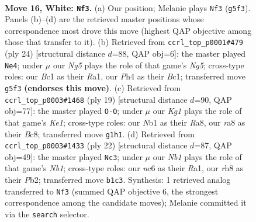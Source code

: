 \documentclass[11pt]{article}
\begin{document}
\clearpage

\begin{figure}[p]\centering
\begin{subfigure}{0.46\textwidth}\centering
\resizebox{\linewidth}{!}{%
\newchessgame
\chessboard[
  setfen={r1b1kb1r/2q2ppp/1pn5/p3P1N1/3p3P/1Q6/PP3PP1/RNB2RK1 w q - 2 16},
  showmover=false,
  pgfstyle=straightmove, color=movearrow, markmove={g5-f3}
]}
\caption{}
\end{subfigure}\hfill
\begin{subfigure}{0.46\textwidth}\centering
\resizebox{\linewidth}{!}{%
\newchessgame
\chessboard[
  setfen={r1b2rk1/ppq2pp1/2nbp2p/6N1/3P4/1BP5/P3QPPP/R1B1K2R w KQ - 0 13},
  showmover=false,
  pgfstyle=straightmove, color=movearrow, markmove={g5-e4}
]}
\caption{}
\end{subfigure}
\\[4pt]
\begin{subfigure}{0.46\textwidth}\centering
\resizebox{\linewidth}{!}{%
\newchessgame
\chessboard[
  setfen={r1b1k2r/ppp1qppp/2n5/3p4/3Pn3/PQ6/1PP1NPPP/R1B1KB1R b KQkq - 2 10},
  showmover=false,
  pgfstyle=straightmove, color=movearrow, markmove={e8-g8}
]}
\caption{}
\end{subfigure}\hfill
\begin{subfigure}{0.46\textwidth}\centering
\resizebox{\linewidth}{!}{%
\newchessgame
\chessboard[
  setfen={r1b1k2r/ppq1bppp/2p2n2/8/8/1Q2PB2/PP1B1PPP/RN3RK1 w kq - 4 12},
  showmover=false,
  pgfstyle=straightmove, color=movearrow, markmove={b1-c3}
]}
\caption{}
\end{subfigure}
\caption{\textbf{Move 16, White: \texttt{Nf3}.} (a) Our position; Melanie plays \texttt{Nf3} (\texttt{g5f3}). Panels (b)--(d) are the retrieved master positions whose correspondence most drove this move (highest QAP objective among those that transfer to it). (b) Retrieved from \texttt{ccrl\_top\_p0001\#479} (ply 24) [structural distance $d$=88, QAP obj=6]: the master played \texttt{Ne4}; under $\mu$ our \emph{Ng5} plays the role of that game's \emph{Ng5}; cross-type roles: our \emph{B}c1 as their \emph{R}a1, our \emph{P}h4 as their \emph{B}c1; transferred move \texttt{g5f3} \textbf{(endorses this move)}. (c) Retrieved from \texttt{ccrl\_top\_p0003\#1468} (ply 19) [structural distance $d$=90, QAP obj=77]: the master played \texttt{O-O}; under $\mu$ our \emph{Kg1} plays the role of that game's \emph{Ke1}; cross-type roles: our \emph{N}b1 as their \emph{R}a8, our \emph{r}a8 as their \emph{B}c8; transferred move \texttt{g1h1}. (d) Retrieved from \texttt{ccrl\_top\_p0003\#1433} (ply 22) [structural distance $d$=87, QAP obj=49]: the master played \texttt{Nc3}; under $\mu$ our \emph{Nb1} plays the role of that game's \emph{Nb1}; cross-type roles: our \emph{n}c6 as their \emph{R}a1, our \emph{r}h8 as their \emph{P}b2; transferred move \texttt{b1c3}. Synthesis: 1 retrieved analog transferred to \texttt{Nf3} (summed QAP objective 6, the strongest correspondence among the candidate moves); Melanie committed it via the \texttt{search} selector.}
\label{fig:thought-m30}
\end{figure}
\end{document}
